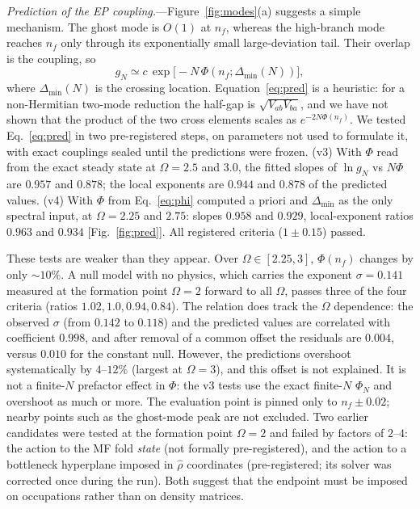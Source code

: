 \documentclass[aps,prl,twocolumn,superscriptaddress,amsmath,amssymb,reprint]{revtex4-2}
\begin{document}
\emph{Prediction of the EP coupling.}---Figure~\ref{fig:modes}(a) suggests a simple mechanism. The ghost mode is $O(1)$ at $n_f$, whereas the high-branch mode reaches $n_f$ only through its exponentially small large-deviation tail. Their overlap is the coupling, so
\begin{equation}
g_N\simeq c\,\exp\!\big[-N\,\Phi(n_f;\Delta_{\min}(N))\big],
\label{eq:pred}
\end{equation}
where $\Delta_{\min}(N)$ is the crossing location. Equation~\eqref{eq:pred} is a heuristic: for a non-Hermitian two-mode reduction the half-gap is $\sqrt{V_{ab}V_{ba}}$, and we have not shown that the product of the two cross elements scales as $e^{-2N\Phi(n_f)}$. We tested Eq.~\eqref{eq:pred} in two pre-registered steps, on parameters not used to formulate it, with exact couplings sealed until the predictions were frozen. (v3) With $\Phi$ read from the exact steady state at $\Omega=2.5$ and $3.0$, the fitted slopes of $\ln g_N$ vs $N\Phi$ are $0.957$ and $0.878$; the local exponents are $0.944$ and $0.878$ of the predicted values. (v4) With $\Phi$ from Eq.~\eqref{eq:phi} computed a priori and $\Delta_{\min}$ as the only spectral input, at $\Omega=2.25$ and $2.75$: slopes $0.958$ and $0.929$, local-exponent ratios $0.963$ and $0.934$ [Fig.~\ref{fig:pred}]. All registered criteria ($1\pm0.15$) passed.

These tests are weaker than they appear. Over $\Omega\in[2.25,3]$, $\Phi(n_f)$ changes by only $\sim10\%$. A null model with no physics, which carries the exponent $\sigma=0.141$ measured at the formation point $\Omega=2$ forward to all $\Omega$, passes three of the four criteria (ratios $1.02,1.0,0.94,0.84$). The relation does track the $\Omega$ dependence: the observed $\sigma$ (from $0.142$ to $0.118$) and the predicted values are correlated with coefficient $0.998$, and after removal of a common offset the residuals are $0.004$, versus $0.010$ for the constant null. However, the predictions overshoot systematically by $4$--$12\%$ (largest at $\Omega=3$), and this offset is not explained. It is not a finite-$N$ prefactor effect in $\Phi$: the v3 tests use the exact finite-$N$ $\Phi_N$ and overshoot as much or more. The evaluation point is pinned only to $n_f\pm0.02$; nearby points such as the ghost-mode peak are not excluded. Two earlier candidates were tested at the formation point $\Omega=2$ and failed by factors of $2$--$4$: the action to the MF fold \emph{state} (not formally pre-registered), and the action to a bottleneck hyperplane imposed in $\hat\rho$ coordinates (pre-registered; its solver was corrected once during the run). Both suggest that the endpoint must be imposed on occupations rather than on density matrices.
\end{document}
